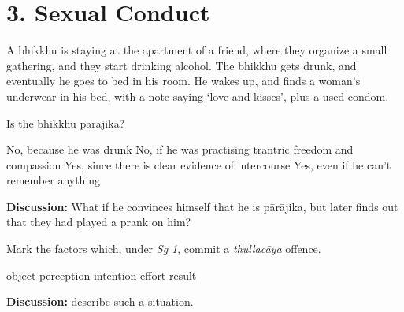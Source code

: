 \chapter{3. Sexual Conduct}
\renewcommand*{\theChapterTitle}{3. Sexual Conduct}

\begin{exam}{\autoExamName}

\begin{problem}

  A bhikkhu is staying at the apartment of a friend, where they organize a small
  gathering, and they start drinking alcohol. The bhikkhu gets drunk, and
  eventually he goes to bed in his room. He wakes up, and finds a woman's
  underwear in his bed, with a note saying `love and kisses', plus a used
  condom.

  Is the bhikkhu pārājika? 

  \bigskip
 
  \begin{answers}{1}
    \bChoices
     No, because he was drunk\eAns
     No, if he was practising trantric freedom and compassion\eAns
     Yes, since there is clear evidence of intercourse\eAns
     Yes, even if he can't remember anything\eAns
    \eChoices
  \end{answers}

  \bigskip

  \textbf{Discussion:} What if he convinces himself that he is pārājika, but
  later finds out that they had played a prank on him?
  
\end{problem}

\problemDivide

\begin{problem}

  Mark the factors which, under \textit{Sg 1}, commit a \textit{thullacāya} offence.

  \begin{answers}{6}
    \bChoices
     object\eAns
     perception\eAns
     intention\eAns
     effort\eAns
     result\eAns
    \eChoices
  \end{answers}

  \bigskip

  \textbf{Discussion:} describe such a situation.

\end{problem}

\problemDivide

\begin{problem*}


\end{problem*}
\end{exam}
